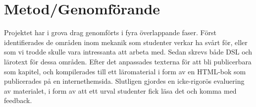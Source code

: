 



\chapter{Metod/Genomförande}

%


\begin{draft}

  Projektet har i grova drag genomförts i fyra överlappande
  faser. Först identifierades de områden inom mekanik som studenter
  verkar ha svårt för, eller som vi trodde skulle vara intressanta att
  arbeta med. Sedan skrevs både DSL och lärotext för dessa
  områden. Efter det anpassades texterna för att bli publicerbara som
  kapitel, och kompilerades till ett läromaterial i form av en
  HTML-bok som publicerades på en internethemsida. Slutligen gjordes
  en icke-rigorös evaluering av materialet, i form av att ett urval
  studenter fick läsa det och komma med feedback.

\end{draft}


